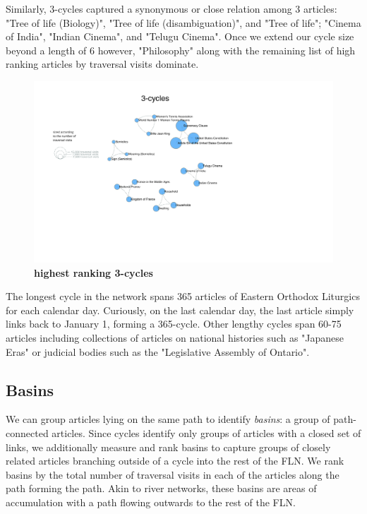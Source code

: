 \documentclass[pre,twocolumn,twoside,superscriptaddress,floatfix, aps, 10pt]{revtex4-1}
\begin{document}
Similarly, 3-cycles captured a synonymous or close relation among 3 articles: "Tree of life (Biology)", "Tree of life (disambiguation)", 
and "Tree of life"; "Cinema of India", "Indian Cinema", and "Telugu Cinema". Once we extend our cycle size beyond a length of 6 however, 
"Philosophy" along with the remaining list of high ranking articles by traversal visits dominate.

\begin{figure}[tp!]
  \centering	
  \includegraphics[width=\textwidth]{graphics/3_cycles.pdf}
  \caption{
    \textbf{highest ranking 3-cycles}
  }
  \label{fig:3-cycles}
\end{figure}

The longest cycle in the network spans 365 articles of Eastern Orthodox Liturgics for each calendar day. 
Curiously, on the last calendar day, the last article simply links back to January 1, forming a 365-cycle.
Other lengthy cycles span 60-75 articles including collections of articles on national histories such as "Japanese Eras" 
or judicial bodies such as the "Legislative Assembly of Ontario".





\subsection{Basins}

We can group articles lying on the same path to identify {\it basins}: 
a group of path-connected articles.
Since cycles identify only groups of articles with a closed set of links, 
we additionally measure and rank basins to capture groups of closely related
articles branching outside of a cycle into the rest of the FLN.
We rank basins by the total number of traversal visits in each of the articles
along the path forming the path.
Akin to river networks, these basins are areas of accumulation with a path 
flowing outwards to the rest of the FLN.
\end{document}
